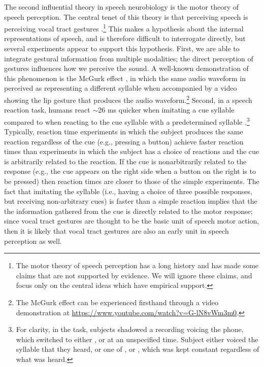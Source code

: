 {The second influential theory
in speech neurobiology is the
motor theory of speech perception.
The central tenet of this theory
is that perceiving speech
is perceiving vocal tract gestures
\citep{liberman1985,galantucci2006}.\footnote{
  The motor theory of speech perception has a long history
  and has made some claims that are not supported by evidence.
  We will ignore these claims, and focus only on
  the central ideas which have empirical support.}
This makes a hypothesis about
the internal representations of speech,
and is therefore difficult
to interrogate directly,
but several experiments appear
to support this hypothesis.
First, we are able to integrate
gestural information from multiple modalities;
the direct perception of gestures
influences how we perceive the sound.
A well-known demonstration of
this phenomenon is the McGurk effect
\citep{mcgurk1976},
in which the same audio waveform
in perceived as representing a different syllable
when accompanied by a video
showing the lip gesture that produces
the audio waveform.\footnote{
  The McGurk effect can be experienced firsthand through
  a video demonstration at
  \url{https://www.youtube.com/watch?v=G-lN8vWm3m0}.}
Second, in a speech reaction task,
humans react $\sim$26 ms quicker
when imitating a cue syllable
compared to when reacting
to the cue syllable
with a predetermined syllable
\citep{fowler2003}.\footnote{
  For clarity, in the task, subjects
  shadowed a recording voicing the \ipa{[A]} phone,
  which switched to either \ipa{[pA]}, \ipa{[tA]} or \ipa{[kA]} at an
  unspecified time.
  Subject either voiced the syllable that they heard,
  or one of \ipa{[pA]}, \ipa{[tA]} or \ipa{[kA]},
  which was kept constant regardless of what was heard.}
Typically, reaction time experiments
in which the subject produces the same reaction
regardless of the cue (e.g., pressing a button)
achieve faster reaction times
than experiments in which the subject
has a choice of reactions
and the cue is arbitrarily related
to the reaction.
If the cue is nonarbitrarily related
to the response
(e.g., the cue appears on the right side
when a button on the right is to be pressed)
then reaction times are closer to those
of the simple experiments.
The fact that imitating the syllable
(i.e., having a choice of three possible responses,
but receiving non-arbitrary cues)
is faster than a simple reaction
implies that the the information gathered
from the cue is directly related
to the motor response;
since vocal tract gestures are thought
to be the basic unit of speech motor action,
then it is likely that vocal tract gestures
are also an early unit
in speech perception as well.

}
